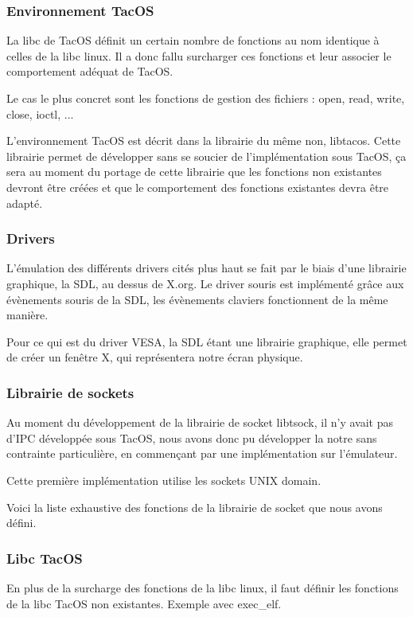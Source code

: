 \subsubsection{Environnement TacOS}

La libc de TacOS définit un certain nombre de fonctions au nom identique à celles de la libc linux.
Il a donc fallu surcharger ces fonctions et leur associer le comportement adéquat de TacOS.

Le cas le plus concret sont les fonctions de gestion des fichiers : open, read, write, close, ioctl, ...


L'environnement TacOS est décrit dans la librairie du même non, libtacos.
Cette librairie permet de développer sans se soucier de l'implémentation sous TacOS, ça sera au moment du portage de cette librairie que les fonctions non existantes devront être créées et que le comportement des fonctions existantes devra être adapté.

\subsubsection{Drivers}

L'émulation des différents drivers cités plus haut se fait par le biais d'une librairie graphique, la SDL, au dessus de X.org.
Le driver souris est implémenté grâce aux évènements souris de la SDL, les évènements claviers fonctionnent de la même manière.

Pour ce qui est du driver VESA, la SDL étant une librairie graphique, elle permet de créer un fenêtre X, qui représentera notre écran physique. 


\subsubsection{Librairie de sockets}

Au moment du développement de la librairie de socket libtsock, il n'y avait pas d'IPC développée sous TacOS, nous avons donc pu développer la notre sans contrainte particulière, en commençant par une implémentation sur l'émulateur.

Cette première implémentation utilise les sockets UNIX domain.

Voici la liste exhaustive des fonctions de la librairie de socket que nous avons défini.



\subsubsection{Libc TacOS}

En plus de la surcharge des fonctions de la libc linux, il faut définir les fonctions de la libc TacOS non existantes. Exemple avec exec\_elf.

